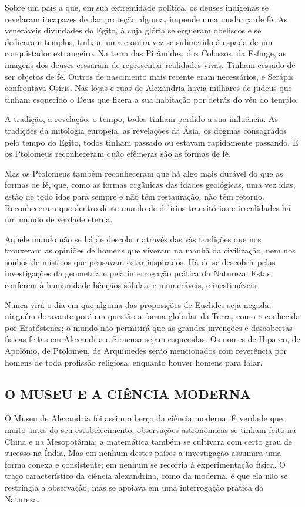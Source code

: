 \documentclass[11pt,a5paper,twoside,openany]{book}
\begin{document}
Sobre um país a que, em sua extremidade política, os deuses indígenas se revelaram incapazes de dar proteção alguma, impende uma mudança de fé. As veneráveis divindades do Egito, à cuja glória se ergueram obeliscos e se dedicaram templos, tinham uma e outra vez se submetido à espada de um conquistador estrangeiro. Na terra das Pirâmides, dos Colossos, da Esfinge, as imagens dos deuses cessaram de representar realidades vivas. Tinham cessado de ser objetos de fé. Outros de nascimento mais recente eram necessários, e Serápis confrontava Osíris. Nas lojas e ruas de Alexandria havia milhares de judeus que tinham esquecido o Deus que fizera a sua habitação por detrás do véu do templo.

A tradição, a revelação, o tempo, todos tinham perdido a sua influência. As tradições da mitologia europeia, as revelações da Ásia, os dogmas consagrados pelo tempo do Egito, todos tinham passado ou estavam rapidamente passando. E os Ptolomeus reconheceram quão efêmeras são as formas de fé.

Mas os Ptolomeus também reconheceram que há algo mais durável do que as formas de fé, que, como as formas orgânicas das idades geológicas, uma vez idas, estão de todo idas para sempre e não têm restauração, não têm retorno. Reconheceram que dentro deste mundo de delírios transitórios e irrealidades há um mundo de verdade eterna.

Aquele mundo não se há de descobrir através das vãs tradições que nos trouxeram as opiniões de homens que viveram na manhã da civilização, nem nos sonhos de místicos que pensavam estar inspirados. Há de se descobrir pelas investigações da geometria e pela interrogação prática da Natureza. Estas conferem à humanidade bênçãos sólidas, e inumeráveis, e inestimáveis.

Nunca virá o dia em que alguma das proposições de Euclides seja negada; ninguém doravante porá em questão a forma globular da Terra, como reconhecida por Eratóstenes; o mundo não permitirá que as grandes invenções e descobertas físicas feitas em Alexandria e Siracusa sejam esquecidas. Os nomes de Hiparco, de Apolônio, de Ptolomeu, de Arquimedes serão mencionados com reverência por homens de toda profissão religiosa, enquanto houver homens para falar.

\subsection*{O MUSEU E A CIÊNCIA MODERNA}
O Museu de Alexandria foi assim o berço da ciência moderna. É verdade que, muito antes do seu estabelecimento, observações astronômicas se tinham feito na China e na Mesopotâmia; a matemática também se cultivara com certo grau de sucesso na Índia. Mas em nenhum destes países a investigação assumira uma forma conexa e consistente; em nenhum se recorria à experimentação física. O traço característico da ciência alexandrina, como da moderna, é que ela não se restringia à observação, mas se apoiava em uma interrogação prática da Natureza.
\end{document}
